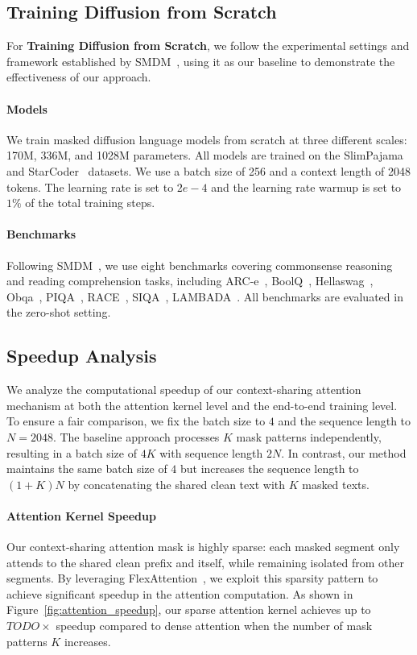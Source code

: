 \subsection{Training Diffusion from Scratch}

For \textbf{Training Diffusion from Scratch}, we follow the experimental settings and framework established by SMDM~\citep{smdm}, using it as our baseline to demonstrate the effectiveness of our approach.

\paragraph{Models}

We train masked diffusion language models from scratch at three different scales: 170M, 336M, and 1028M parameters.
All models are trained on the SlimPajama~\citep{slimpajama} and StarCoder~\citep{starcoder} datasets.
We use a batch size of 256 and a context length of 2048 tokens.
The learning rate is set to $2e-4$ and the learning rate warmup is set to $1\%$ of the total training steps.

\paragraph{Benchmarks}

Following SMDM~\citep{smdm}, we use eight benchmarks covering commonsense reasoning and reading comprehension tasks, including
ARC-e~\citep{arc}, BoolQ~\citep{boolq}, Hellaswag~\citep{hellaswag}, Obqa~\citep{obqa}, PIQA~\citep{piqa}, RACE~\citep{race}, SIQA~\citep{siqa}, LAMBADA~\citep{lambada}.
All benchmarks are evaluated in the zero-shot setting.

\subsection{Speedup Analysis}

We analyze the computational speedup of our context-sharing attention mechanism at both the attention kernel level and the end-to-end training level.
To ensure a fair comparison, we fix the batch size to $4$ and the sequence length to $N = 2048$.
The baseline approach processes $K$ mask patterns independently, resulting in a batch size of $4K$ with sequence length $2N$.
In contrast, our method maintains the same batch size of $4$ but increases the sequence length to $(1+K)N$ by concatenating the shared clean text with $K$ masked texts.

\paragraph{Attention Kernel Speedup}
Our context-sharing attention mask is highly sparse: each masked segment only attends to the shared clean prefix and itself, while remaining isolated from other segments.
By leveraging FlexAttention~\citep{flexattention}, we exploit this sparsity pattern to achieve significant speedup in the attention computation.
As shown in Figure~\ref{fig:attention_speedup}, our sparse attention kernel achieves up to $TODO\times$ speedup compared to dense attention when the number of mask patterns $K$ increases.

